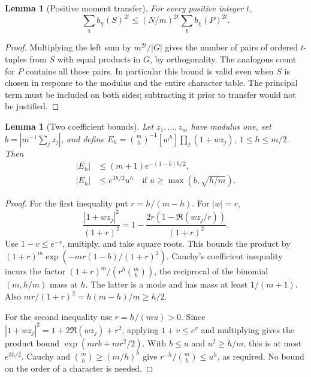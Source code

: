\documentclass[11pt]{article}
\newtheorem{lemma}[theorem]{Lemma}
\theoremstyle{remark}\newtheorem{remark}[theorem]{Remark}
\begin{document}
\begin{lemma}[Positive moment transfer]\label{lem:transfer}
For every positive integer $t$,
\[
 \sum_\chi b_\chi(S)^{2t}\le (N/m)^{2t}\sum_\chi b_\chi(P)^{2t}.
\]
\end{lemma}
\begin{proof}
Multiplying the left sum by $m^{2t}/|G|$ gives the number of pairs of ordered $t$-tuples from $S$ with equal products in $G$, by orthogonality. The analogous count for $P$ contains all those pairs. In particular this bound is valid even when $S$ is chosen in response to the modulus and the entire character table. The principal term must be included on both sides; subtracting it prior to transfer would not be justified.
\end{proof}

\begin{lemma}[Two coefficient bounds]\label{lem:coeff}
Let $z_1,\ldots,z_m$ have modulus one, set $b=|m^{-1}\sum_j z_j|$, and define $E_h=\binom mh^{-1}[w^h]\prod_j(1+wz_j)$, $1\le h\le m/2$. Then
\begin{align}
 |E_h|&\le (m+1)e^{-(1-b)h/2},\label{eq:circle}\\
 |E_h|&\le e^{3h/2}u^h\quad\text{if }u\ge\max(b,\sqrt{h/m}).\label{eq:small}
\end{align}
\end{lemma}
\begin{proof}
For the first inequality put $r=h/(m-h)$. For $|w|=r$,
\[
 \frac{|1+wz_j|^2}{(1+r)^2}
 =1-\frac{2r(1-\Re(wz_j/r))}{(1+r)^2}.
\]
Use $1-v\le e^{-v}$, multiply, and take square roots. This bounds the product by $(1+r)^m\exp(-mr(1-b)/(1+r)^2)$. Cauchy's coefficient inequality incurs the factor $(1+r)^m/(r^h\binom mh)$, the reciprocal of the binomial $(m,h/m)$ mass at $h$. The latter is a mode and has mass at least $1/(m+1)$. Also $mr/(1+r)^2=h(m-h)/m\ge h/2$.

For the second inequality use $r=h/(mu)>0$. Since $|1+wz_j|^2=1+2\Re(wz_j)+r^2$, applying $1+v\le e^v$ and multiplying gives the product bound $\exp(mrb+mr^2/2)$. With $b\le u$ and $u^2\ge h/m$, this is at most $e^{3h/2}$. Cauchy and $\binom mh\ge(m/h)^h$ give $r^{-h}/\binom mh\le u^h$, as required. No bound on the order of a character is needed.
\end{proof}
\end{document}
